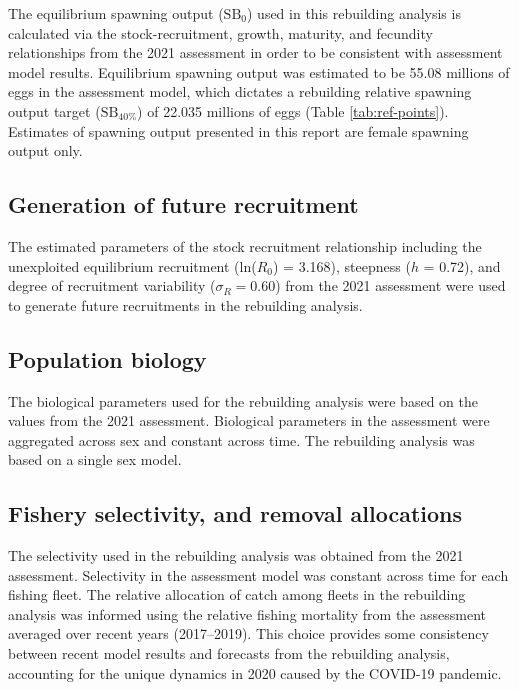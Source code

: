 \documentclass[11pt,
  letterpaper,
]{article}
\begin{document}
The equilibrium spawning output (\(\text{SB}_0\)) used in this rebuilding analysis is calculated via the stock-recruitment, growth, maturity, and fecundity relationships from the 2021 assessment in order to be consistent with assessment model results. Equilibrium spawning output was estimated to be 55.08 millions of eggs in the assessment model, which dictates a rebuilding relative spawning output target (\(\text{SB}_{40\%}\)) of 22.035 millions of eggs (Table \ref{tab:ref-points}). Estimates of spawning output presented in this report are female spawning output only.

\hypertarget{generation-of-future-recruitment}{%
\subsection{Generation of future recruitment}\label{generation-of-future-recruitment}}

The estimated parameters of the stock recruitment relationship including the unexploited equilibrium recruitment (ln(\(R_0\)) = 3.168), steepness (\(h\) = 0.72), and degree of recruitment variability (\(\sigma_R = 0.60\)) from the 2021 assessment were used to generate future recruitments in the rebuilding analysis.

\hypertarget{population-biology}{%
\subsection{Population biology}\label{population-biology}}

The biological parameters used for the rebuilding analysis were based on the values from the 2021 assessment. Biological parameters in the assessment were aggregated across sex and constant across time. The rebuilding analysis was based on a single sex model.

\hypertarget{fishery-selectivity-and-removal-allocations}{%
\subsection{Fishery selectivity, and removal allocations}\label{fishery-selectivity-and-removal-allocations}}

The selectivity used in the rebuilding analysis was obtained from the 2021 assessment. Selectivity in the assessment model was constant across time for each fishing fleet. The relative allocation of catch among fleets in the rebuilding analysis was informed using the relative fishing mortality from the assessment averaged over recent years (2017--2019). This choice provides some consistency between recent model results and forecasts from the rebuilding analysis, accounting for the unique dynamics in 2020 caused by the COVID-19 pandemic.
\end{document}
